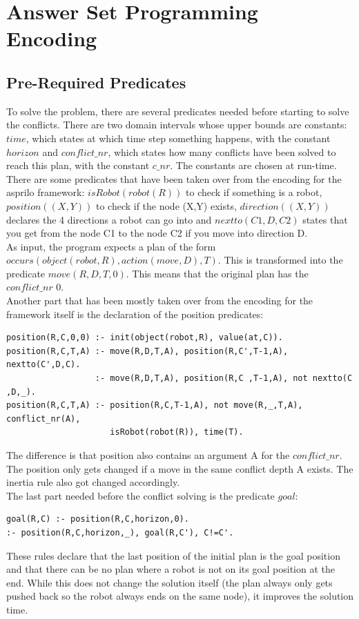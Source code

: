 \documentclass[runningheads]{llncs}
\begin{document}
\section{Answer Set Programming Encoding}
\subsection{Pre-Required Predicates}
To solve the problem, there are several predicates needed before starting to solve the conflicts. There are two domain intervals whose upper bounds are constants: $time$, which states at which time step something happens, with the constant $horizon$ and $conflict\_nr$, which states how many conflicts have been solved to reach this plan, with the constant $c\_nr$.
The constants are chosen at run-time. \\ There are some predicates that have been taken over from the encoding for the asprilo framework: $isRobot(robot(R))$ to check if something is a robot, $position((X,Y))$ to check if the node (X,Y) exists, $direction((X,Y))$ declares the 4 directions a robot can go into and $nextto(C1,D,C2)$ states that you get from the node C1 to the node C2 if you move into direction D. \\  
As input, the program expects a plan of the form $occurs(object(robot,R),action(move,D),T)$. This is transformed into the predicate $move(R,D,T,0)$. This means that the original plan has the $conflict\_nr$ 0. \\
Another part that has been mostly taken over from the encoding for the framework itself is the declaration of the position predicates:
\begin{verbatim}
position(R,C,0,0) :- init(object(robot,R), value(at,C)).
position(R,C,T,A) :- move(R,D,T,A), position(R,C',T-1,A), nextto(C',D,C).
                  :- move(R,D,T,A), position(R,C ,T-1,A), not nextto(C ,D,_).
position(R,C,T,A) :- position(R,C,T-1,A), not move(R,_,T,A), conflict_nr(A), 
                     isRobot(robot(R)), time(T).
\end{verbatim}
The difference is that position also contains an argument A for the $conflict\_nr$. The position only gets changed if a move in the same conflict depth A exists. The inertia rule also got changed accordingly. \\
The last part needed before the conflict solving is the predicate $goal$:
\begin{verbatim}
goal(R,C) :- position(R,C,horizon,0).
:- position(R,C,horizon,_), goal(R,C'), C!=C'.
\end{verbatim}
These rules declare that the last position of the initial plan is the goal position and that there can be no plan where a robot
is not on its goal position at the end. While this does not change the solution itself (the plan always only gets pushed back so the robot always ends on the same node), it improves the solution time. \\
\end{document}
